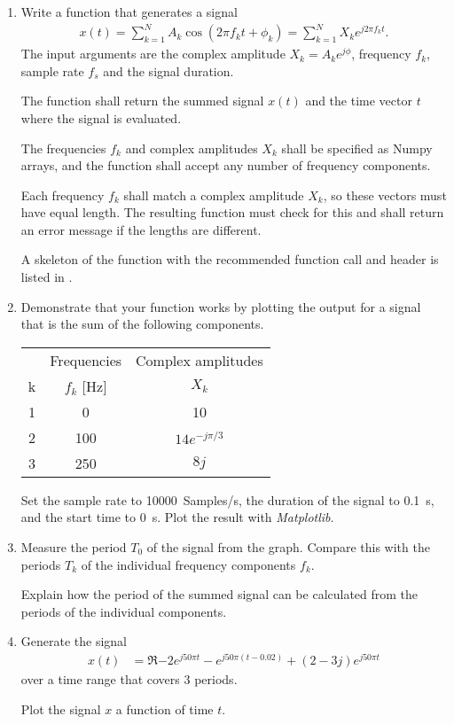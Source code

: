 \begin{enumerate}[1)]
	\item Write a function that generates a signal
	\begin{align*}
		x(t)= \sum_{k=1}^{N} A_k \cos(2\pi f_k t + \phi_k) =\sum_{k=1}^{N} X_k e^{j2\pi f_k t}.
	\end{align*}
	The input arguments are the complex amplitude $X_k=A_k e^{j\phi}$, frequency $f_k$, sample rate $f_s$ and the signal duration.
	
	The function shall return the summed signal $x(t)$ and the time vector $t$ where the signal is evaluated.
	
	The frequencies $f_k$ and complex amplitudes $X_k$ shall be specified as Numpy arrays, and the function shall accept any number of frequency components. 
	
	Each frequency $f_k$ shall match a complex amplitude $X_k$, so these vectors must have equal length. The resulting function must check for this and shall return an error message if the lengths are different. 
	
	A skeleton of the function with the recommended function call and header is listed in . 
	
	
	\item Demonstrate that your function works by plotting the output for a signal that is the sum of the following components.
	\begin{center}
		\begin{tabular}{ccc}
			\hline
				&	Frequencies	& Complex amplitudes	\\
			k	&	$f_k$ [Hz]		& $X_k$  			\\
			\hline
			1	&	\num{0}		& \num{10}				\\
			2	&	\num{100}	& $14e^{-j\pi/3}$		\\
			3	&	\num{250}	& 	$8j$				\\
		\hline
		\end{tabular}
	\end{center}
	Set the sample rate to \qty{10000}{Samples/s}, the duration of the signal to \qty{0.1}{s}, and the start time to \qty{0}{s}. Plot the result with \emph{Matplotlib}.
	
	\item Measure the period $T_0 $ of the signal from the graph. Compare this with the periods $T_k$ of the individual frequency components $f_k$.
	
	Explain how the period of the summed signal can be calculated from the periods of the individual components.
	
	\item Generate the signal
	\begin{align*}
		x(t) &= \Re{-2e^{j50\pi t} - e^{j50\pi(t-0.02)} +(2-3j)e^{j50\pi t}   } 
	\end{align*}
	over a time range that covers 3 periods. 
	
	Plot the signal $x$ a function of time $t$.
	

\end{enumerate}


